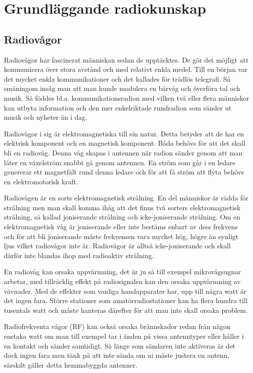 \chapter{Grundläggande radiokunskap}

\section{Radiovågor}

Radiovågor har fascinerat människan sedan de upptäcktes. De gör det möjligt att kommunicera över stora avstånd och med relativt enkla medel. Till en början var det mycket enkla kommunikationer och det kallades för trådlös telegrafi. Så småningom insåg man att man kunde modulera en bärvåg och överföra tal och musik. Så föddes bl.a. kommunikationsradion med vilken två eller flera människor kan utbyta information och den mer enkelriktade rundradion som sänder ut musik och nyheter än i dag.

Radiovågor i sig är elektromagnetiska till sin natur. Detta betyder att de har en elektrisk komponent och en magnetisk komponent. Båda behövs för att det skall bli en radiovåg. Denna våg skapas i antennen när radion sänder genom att man låter en växelström snabbt gå genom antennen. En ström som går i en ledare genererar ett magnetfält rund denna ledare och för att få ström att flyta behövs en elektromotorisk kraft.

Radiovågen är en sorts elektromagnetisk strålning. En del människor är rädda för strålning men man skall komma ihåg att det finns två sorters elektromagnetisk strålning, så kallad joniserande strålning och icke-joniserande strålning. Om en elektromagnetisk våg är joniserande eller inte bestäms enbart av dess frekvens och för att bli joniserande måste frekvensen vara mycket hög, högre än synligt ljus vilket radiovågor inte är. Radiovågor är alltså icke-joniserande och skall därför inte blandas ihop med radioaktiv strålning.

En radiovåg kan orsaka uppvärmning, det är ju så till exempel mikrovågsugnar arbetar, med tillräcklig effekt på radiosignalen kan den orsaka uppvärmning av vävnader. Med de effekter som vanliga handapparater har, upp till några watt är det ingen fara. Större stationer som amatörradiostationer kan ha flera hundra till tusentals watt och måste hanteras därefter för att man inte skall orsaka problem.

Radiofrekventa vågor (RF) kan också orsaka brännskador redan från någon enstaka watt om man till exempel tar i änden på vissa antenntyper eller håller i en kontakt och sänder samtidigt. Så länge som sändaren inte aktiveras är det dock ingen fara men tänk på att inte sända om ni måste justera en antenn, särskilt gäller detta hemmabyggda antenner.

